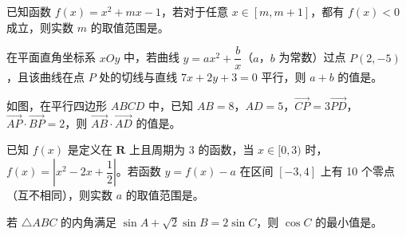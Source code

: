 \begin{question}
已知函数 $f(x)=x^2+mx-1$，若对于任意 $x\in[m,m+1]$，都有 $f(x)<0$ 成立，则实数 $m$ 的取值范围是\gkblank{}。

\end{question}
\begin{question}
在平面直角坐标系 $xOy$ 中，若曲线 $y=ax^2+\dfrac bx$（$a$，$b$ 为常数）过点 $P(2,-5)$，且该曲线在点 $P$ 处的切线与直线 $7x+2y+3=0$ 平行，则 $a+b$ 的值是\gkblank{}。

\Needspace{0.4\textheight}
\end{question}
\begin{question}
如图，在平行四边形 $ABCD$ 中，已知 $AB=8$，$AD=5$，$\overrightarrow{CP}=3\overrightarrow{PD}$，$\overrightarrow{AP}\cdot\overrightarrow{BP}=2$，则 $\overrightarrow{AB}\cdot\overrightarrow{AD}$ 的值是\gkblank{}。
\nopagebreak[4]
\begin{center}\end{center}
\nopagebreak[4]
\end{question}
\begin{question}
已知 $f(x)$ 是定义在 $\mathbf R$ 上且周期为 3 的函数，当 $x\in[0,3)$ 时，$f(x)=\left|x^2-2x+\dfrac12\right|$。若函数 $y=f(x)-a$ 在区间 $[-3,4]$ 上有 10 个零点（互不相同），则实数 $a$ 的取值范围是\gkblank{}。

\end{question}
\begin{question}
若 $\triangle ABC$ 的内角满足 $\sin A+\sqrt2\sin B=2\sin C$，则 $\cos C$ 的最小值是\gkblank{}。

\end{question}

